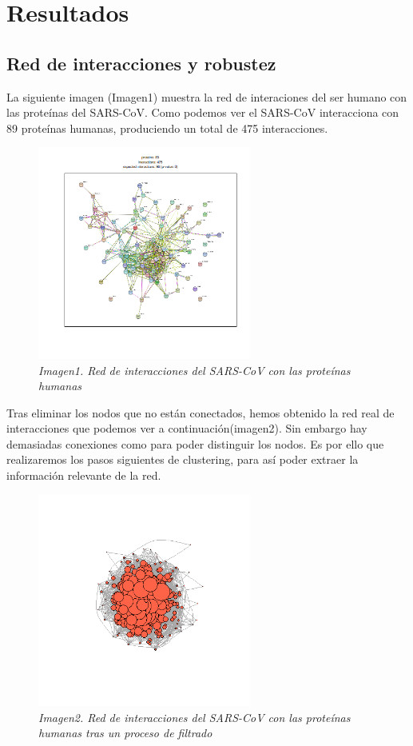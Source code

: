 
\section{Resultados}

\subsection{Red de interacciones y robustez}

La siguiente imagen (Imagen1) muestra la red de interaciones del ser humano con las proteínas del SARS-CoV. Como podemos ver el SARS-CoV interacciona con 89 proteínas humanas, produciendo un total de 475 interacciones. 
\begin{figure}
	\centering
	
		\includegraphics[width=70mm,scale=1.2]{figures/string_hits.png}
		
		\caption{\textit{Imagen1. Red de interacciones del SARS-CoV con las proteínas humanas}}
		
\end{figure}

Tras eliminar los nodos que no están conectados, hemos obtenido la red real de interacciones que podemos ver a continuación(imagen2). Sin embargo hay demasiadas conexiones como para poder distinguir los nodos. Es por ello que realizaremos los pasos siguientes de clustering, para así poder extraer la información relevante de la red. 
\begin{figure}
	\centering
	
		\includegraphics[width=70mm,scale=1.2]{figures/hits.network_graph.png}
		
		\caption{\textit{Imagen2. Red de interacciones del SARS-CoV con las proteínas humanas tras un proceso de filtrado}}

\end{figure}


